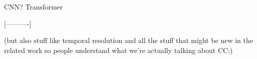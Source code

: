 CNN?
Transformer %


[----------]

(but also stuff like temporal resolution and all the stuff that might be new in the related work so people understand what we're actually talking about CC:)



